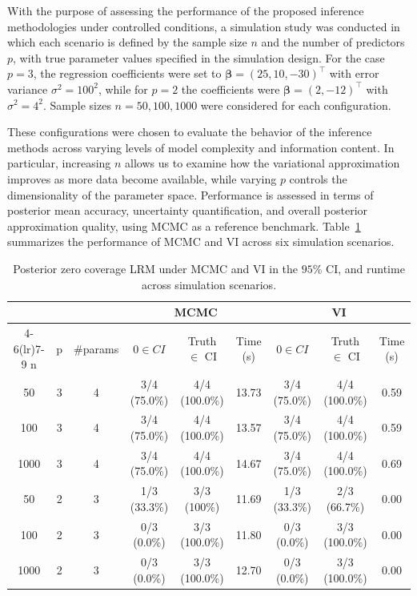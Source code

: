 With the purpose of assessing the performance of the proposed inference methodologies under controlled conditions, a simulation study was conducted in which each scenario is defined by the sample size $n$ and the number of predictors $p$, with true parameter values specified in the simulation design. For the case $p=3$, the regression coefficients were set to $\bm{\beta}=(25,10,-30)^\top$ with error variance $\sigma^2=100^2$, while for $p=2$ the coefficients were $\bm{\beta}=(2,-12)^\top$ with $\sigma^2=4^2$. Sample sizes $n=50,100,1000$ were considered for each configuration.

\vspace{0.5cm}

These configurations were chosen to evaluate the behavior of the inference methods across varying levels of model complexity and information content. In particular, increasing $n$ allows us to examine how the variational approximation improves as more data become available, while varying $p$ controls the dimensionality of the parameter space. Performance is assessed in terms of posterior mean accuracy, uncertainty quantification, and overall posterior approximation quality, using MCMC as a reference benchmark. Table~\ref{tab:method_quality} summarizes the performance of MCMC and VI across six simulation scenarios.

\begin{table}[ht]
\centering
\caption{Posterior zero coverage LRM under MCMC and VI in the $95\%$ CI, and runtime across simulation scenarios. }
\label{tab:method_quality}
\begin{tabular}{ccccccccc}
\toprule
 & & & \multicolumn{3}{c}{\textbf{MCMC}} & \multicolumn{3}{c}{\textbf{VI}} \\
\cmidrule(lr){4-6}\cmidrule(lr){7-9}
  n & p & \#params & $0 \in CI$ & Truth $\in $ CI & Time (s) & $0\in CI$ & Truth $\in$ CI & Time (s) \\

  50   & 3 & 4 & 3/4 (75.0\%)  & 4/4 (100.0\%) & 13.73 & 3/4 (75.0\%)  & 4/4 (100.0\%) & 0.59 \\
  100  & 3 & 4 & 3/4 (75.0\%)  & 4/4 (100.0\%) & 13.57 & 3/4 (75.0\%)  & 4/4 (100.0\%) & 0.59 \\
  1000 & 3 & 4 & 3/4 (75.0\%)  & 4/4 (100.0\%) & 14.67 & 3/4 (75.0\%)  & 4/4 (100.0\%) & 0.69 \\
  50   & 2 & 3 & 1/3 (33.3\%)  & 3/3 (100\%)  & 11.69 & 1/3 (33.3\%)  & 2/3 (66.7\%)  & 0.00 \\
  100  & 2 & 3 & 0/3 (0.0\%)   & 3/3 (100.0\%) & 11.80 & 0/3 (0.0\%)   & 3/3 (100.0\%) & 0.00 \\
  1000 & 2 & 3 & 0/3 (0.0\%)   & 3/3 (100.0\%) & 12.70 & 0/3 (0.0\%)   & 3/3 (100.0\%) & 0.00 \\
\bottomrule
\end{tabular}
\end{table}

